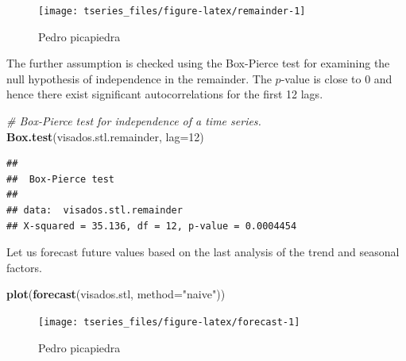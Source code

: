 \documentclass[]{article}
\newenvironment{Shaded}{\begin{snugshade}}{\end{snugshade}}
\newcommand{\KeywordTok}[1]{\textcolor[rgb]{0.13,0.29,0.53}{\textbf{{#1}}}}
\newcommand{\DataTypeTok}[1]{\textcolor[rgb]{0.13,0.29,0.53}{{#1}}}
\newcommand{\DecValTok}[1]{\textcolor[rgb]{0.00,0.00,0.81}{{#1}}}
\newcommand{\StringTok}[1]{\textcolor[rgb]{0.31,0.60,0.02}{{#1}}}
\newcommand{\CommentTok}[1]{\textcolor[rgb]{0.56,0.35,0.01}{\textit{{#1}}}}
\newcommand{\NormalTok}[1]{{#1}}
\begin{document}
\begin{Shaded}
\end{Shaded}

\begin{figure}[H]

{\centering \texttt{[image: tseries\_files/figure-latex/remainder-1]} 

}

\caption{Pedro picapiedra}\label{fig:remainder}
\end{figure}

The further assumption is checked using the Box-Pierce test for
examining the null hypothesis of independence in the remainder. The
\(p\)-value is close to 0 and hence there exist significant
autocorrelations for the first 12 lags.

\begin{Shaded}
\begin{Highlighting}[]
\CommentTok{# Box-Pierce test for independence of a time series.}
\KeywordTok{Box.test}\NormalTok{(visados.stl.remainder, }\DataTypeTok{lag=}\DecValTok{12}\NormalTok{) }
\end{Highlighting}
\end{Shaded}

\begin{verbatim}
## 
##  Box-Pierce test
## 
## data:  visados.stl.remainder
## X-squared = 35.136, df = 12, p-value = 0.0004454
\end{verbatim}

Let us forecast future values based on the last analysis of the trend
and seasonal factors.

\begin{Shaded}
\begin{Highlighting}[]
\KeywordTok{plot}\NormalTok{(}\KeywordTok{forecast}\NormalTok{(visados.stl, }\DataTypeTok{method=}\StringTok{"naive"}\NormalTok{))}
\end{Highlighting}
\end{Shaded}

\begin{figure}[H]

{\centering \texttt{[image: tseries\_files/figure-latex/forecast-1]} 

}

\caption{Pedro picapiedra}\label{fig:forecast}
\end{figure}
\end{document}
